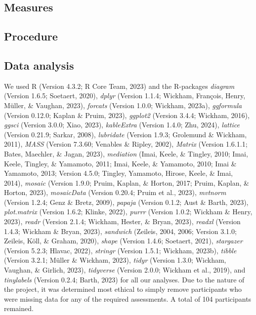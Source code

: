 \documentclass[
  man,floatsintext]{apa6}
\begin{document}
\hypertarget{measures}{%
\subsection{Measures}\label{measures}}

\hypertarget{procedure}{%
\subsection{Procedure}\label{procedure}}

\hypertarget{data-analysis}{%
\subsection{Data analysis}\label{data-analysis}}

We used R (Version 4.3.2; R Core Team, 2023) and the R-packages \emph{diagram} (Version 1.6.5; Soetaert, 2020), \emph{dplyr} (Version 1.1.4; Wickham, François, Henry, Müller, \& Vaughan, 2023), \emph{forcats} (Version 1.0.0; Wickham, 2023a), \emph{ggformula} (Version 0.12.0; Kaplan \& Pruim, 2023), \emph{ggplot2} (Version 3.4.4; Wickham, 2016), \emph{ggsci} (Version 3.0.0; Xiao, 2023), \emph{kableExtra} (Version 1.4.0; Zhu, 2024), \emph{lattice} (Version 0.21.9; Sarkar, 2008), \emph{lubridate} (Version 1.9.3; Grolemund \& Wickham, 2011), \emph{MASS} (Version 7.3.60; Venables \& Ripley, 2002), \emph{Matrix} (Version 1.6.1.1; Bates, Maechler, \& Jagan, 2023), \emph{mediation} (Imai, Keele, \& Tingley, 2010; Imai, Keele, Tingley, \& Yamamoto, 2011; Imai, Keele, \& Yamamoto, 2010; Imai \& Yamamoto, 2013; Version 4.5.0; Tingley, Yamamoto, Hirose, Keele, \& Imai, 2014), \emph{mosaic} (Version 1.9.0; Pruim, Kaplan, \& Horton, 2017; Pruim, Kaplan, \& Horton, 2023), \emph{mosaicData} (Version 0.20.4; Pruim et al., 2023), \emph{mvtnorm} (Version 1.2.4; Genz \& Bretz, 2009), \emph{papaja} (Version 0.1.2; Aust \& Barth, 2023), \emph{plot.matrix} (Version 1.6.2; Klinke, 2022), \emph{purrr} (Version 1.0.2; Wickham \& Henry, 2023), \emph{readr} (Version 2.1.4; Wickham, Hester, \& Bryan, 2023), \emph{readxl} (Version 1.4.3; Wickham \& Bryan, 2023), \emph{sandwich} (Zeileis, 2004, 2006; Version 3.1.0; Zeileis, Köll, \& Graham, 2020), \emph{shape} (Version 1.4.6; Soetaert, 2021), \emph{stargazer} (Version 5.2.3; Hlavac, 2022), \emph{stringr} (Version 1.5.1; Wickham, 2023b), \emph{tibble} (Version 3.2.1; Müller \& Wickham, 2023), \emph{tidyr} (Version 1.3.0; Wickham, Vaughan, \& Girlich, 2023), \emph{tidyverse} (Version 2.0.0; Wickham et al., 2019), and \emph{tinylabels} (Version 0.2.4; Barth, 2023) for all our analyses. Due to the nature of the project, it was determined most ethical to simply remove participants who were missing data for any of the required assessments. A total of 104 participants remained.
\end{document}
